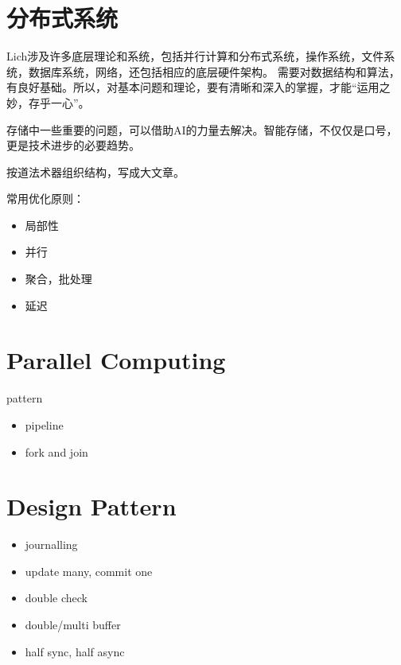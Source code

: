 \chapter{分布式系统}

Lich涉及许多底层理论和系统，包括并行计算和分布式系统，操作系统，文件系统，数据库系统，网络，还包括相应的底层硬件架构。
需要对数据结构和算法，有良好基础。所以，对基本问题和理论，要有清晰和深入的掌握，才能“运用之妙，存乎一心”。

存储中一些重要的问题，可以借助AI的力量去解决。智能存储，不仅仅是口号，更是技术进步的必要趋势。

按道法术器组织结构，写成大文章。

常用优化原则：
\begin{itemize}
    \item 局部性
    \item 并行
    \item 聚合，批处理
    \item 延迟
\end{itemize}

\chapter{Parallel Computing}

pattern
\begin{itemize}
    \item pipeline
    \item fork and join
\end{itemize}

\chapter{Design Pattern}

\begin{itemize}
    \item journalling
    \item update many, commit one
    \item double check
    \item double/multi buffer
    \item half sync, half async
\end{itemize}
